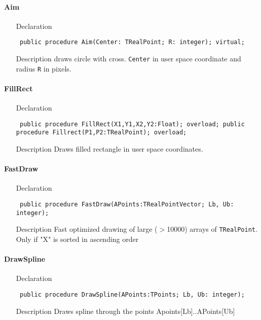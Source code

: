 \documentclass[12pt,a4paper,oneside]{report}
\newcommand{\declarationitem}[1]{{\addfontfeatures{FakeSlant} #1}}
\newcommand{\descriptiontitle}[1]{{\addfontfeatures{FakeSlant}#1}}
\newcommand{\code}[1]{\texttt{#1}}
\begin{document}
\paragraph{Aim}\hspace*{\fill}
\label{lmcoordsys.TCoordSys-Aim}
\begin{itemize}\item[\declarationitem{Declaration}\hfill]
\begin{flushleft}
\code{
public procedure Aim(Center: TRealPoint; R: integer); virtual;}
\end{flushleft}
\item[\descriptiontitle{Description}]
draws circle with cross. \code{Center} in user space coordinate and radius \code{R} in pixels.
\end{itemize}
\paragraph{FillRect}\hspace*{\fill}
\label{lmcoordsys.TCoordSys-FillRect}
\begin{itemize}\item[\declarationitem{Declaration}\hfill]
\begin{flushleft}
\code{
public procedure FillRect(X1,Y1,X2,Y2:Float); overload;
public procedure Fillrect(P1,P2:TRealPoint); overload;}
\end{flushleft}
\item[\descriptiontitle{Description}] Draws filled rectangle in user space coordinates.
\end{itemize}


\paragraph{FastDraw}\hspace*{\fill}\label{lmcoordsys.TCoordSys-FastDraw}
\begin{itemize}\item[\declarationitem{Declaration}\hfill]
\begin{flushleft}
\code{
public procedure FastDraw(APoints:TRealPointVector; Lb, Ub: integer);}
\end{flushleft}
\item[\descriptiontitle{Description}]
Fast optimized drawing of large ({$>$}10000) arrays of \code{TRealPoint}. Only if "X" is sorted in ascending order
\end{itemize}
\paragraph{DrawSpline}\hspace*{\fill}\label{lmcoordsys.TCoordSys-DrawSpline}
\begin{itemize}\item[\declarationitem{Declaration}\hfill]
\begin{flushleft}
\code{
public procedure DrawSpline(APoints:TPoints; Lb, Ub: integer);}
\end{flushleft}
\item[\descriptiontitle{Description}]
Draws spline through the points Apoints[Lb]..APoints[Ub]
\end{itemize}
\end{document}
